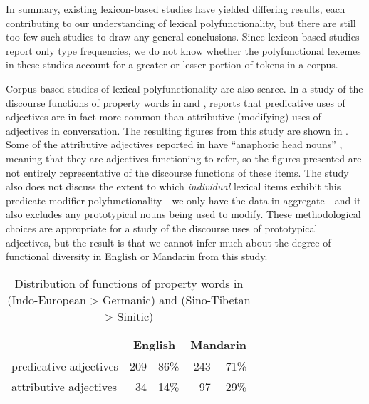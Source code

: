 In summary, existing lexicon-based studies have yielded differing results, each contributing to our understanding of lexical polyfunctionality, but there are still too few such studies to draw any general conclusions. Since lexicon-based studies report only type frequencies, we do not know whether the polyfunctional lexemes in these studies account for a greater or lesser portion of tokens in a corpus.

Corpus-based studies of lexical polyfunctionality are also scarce. In a study of the discourse functions of property words in  and , \textcite{Thompson1989} reports that predicative uses of adjectives are in fact more common than attributive (modifying) uses of adjectives in conversation. The resulting figures from this study are shown in . Some of the attributive adjectives reported in  have \enquote{anaphoric head nouns} \parencite[258]{Thompson1989}, meaning that they are adjectives functioning to refer, so the figures presented are not entirely representative of the discourse functions of these items. The study also does not discuss the extent to which \emph{individual} lexical items exhibit this predicate-modifier polyfunctionality—we only have the data in aggregate—and it also excludes any prototypical nouns being used to modify. These methodological choices are appropriate for a study of the discourse uses of prototypical adjectives, but the result is that we cannot infer much about the degree of functional diversity in English or Mandarin from this study.

\begin{table}[h]
  \centering
  \caption[Distribution of functions of property words in English (Indo-European > Germanic) and Mandarin (Sino-Tibetan > Sinitic)]{Distribution of functions of property words in  (Indo-European > Germanic) and  (Sino-Tibetan > Sinitic) \parencite[253, 257]{Thompson1989}}
  \label{tab:Thompson-1989}
  \begin{tabular}{ l r r r r }
    \toprule
      {                    } & \multicolumn{2}{c}{English} & \multicolumn{2}{c}{Mandarin} \\
    \midrule
      predicative adjectives & 209 & 86\%                  & 243 & 71\% \\
      attributive adjectives &  34 & 14\%                  &  97 & 29\% \\
    \bottomrule
  \end{tabular}
\end{table}

